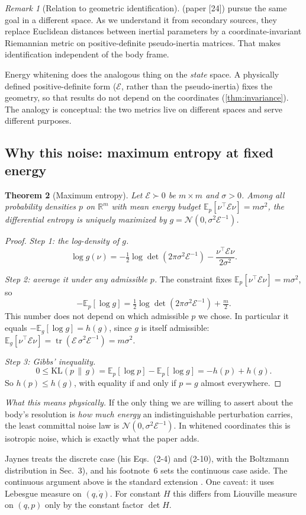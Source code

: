 \documentclass[11pt]{article}
\newtheorem{theorem}{Theorem}
\theoremstyle{definition}
\theoremstyle{remark}
\newtheorem{remark}[theorem]{Remark}
\newcommand{\R}{\mathbb{R}}
\newcommand{\E}{\mathbb{E}}
\newcommand{\tr}{\operatorname{tr}}
\newcommand{\Em}{\mathcal{E}}         %
\newcommand{\phys}[1]{\par\smallskip\noindent\textit{What this means physically.} #1\par}
\begin{document}
\begin{remark}[Relation to geometric identification]
\citet{lee2020geometric} (paper [24]) pursue the same goal in a different space. As we
understand it from secondary sources, they replace Euclidean distances between inertial
parameters by a coordinate-invariant Riemannian metric on positive-definite pseudo-inertia
matrices. That makes identification independent of the body frame.

Energy whitening does the analogous thing on the \emph{state} space. A physically defined
positive-definite form ($\Em$, rather than the pseudo-inertia) fixes the geometry, so that
results do not depend on the coordinates (\cref{thm:invariance}). The analogy is
conceptual: the two metrics live on different spaces and serve different purposes.
\end{remark}

\subsection{Why this noise: maximum entropy at fixed energy}

\begin{theorem}[Maximum entropy]\label{thm:maxent}
Let $\Em\succ0$ be $m\times m$ and $\sigma>0$. Among all probability densities $p$ on
$\R^m$ with mean energy budget $\E_p[\nu^\top\Em\nu]=m\sigma^2$, the differential
entropy is uniquely maximized by $g=\mathcal N(0,\sigma^2\Em^{-1})$.
\end{theorem}
\begin{proof}
\emph{Step 1: the log-density of $g$.}
\[
  \log g(\nu)=-\tfrac12\log\det(2\pi\sigma^2\Em^{-1})-\frac{\nu^\top\Em\nu}{2\sigma^2}.
\]

\emph{Step 2: average it under any admissible $p$.} The constraint fixes
$\E_p[\nu^\top\Em\nu]=m\sigma^2$, so
\[
  -\E_p[\log g]=\tfrac12\log\det(2\pi\sigma^2\Em^{-1})+\tfrac m2 .
\]
This number does not depend on which admissible $p$ we chose. In particular it equals
$-\E_g[\log g]=h(g)$, since $g$ is itself admissible:
$\E_g[\nu^\top\Em\nu]=\tr(\Em\,\sigma^2\Em^{-1})=m\sigma^2$.

\emph{Step 3: Gibbs' inequality.}
\[
  0\le \mathrm{KL}(p\,\|\,g)=\E_p[\log p]-\E_p[\log g]=-h(p)+h(g).
\]
So $h(p)\le h(g)$, with equality if and only if $p=g$ almost everywhere.
\end{proof}

\phys{If the only thing we are willing to assert about the body's resolution is
\emph{how much energy} an indistinguishable perturbation carries, the least committal
noise law \citep[Sec.~2]{jaynes1957information} is $\mathcal N(0,\sigma^2\Em^{-1})$.
In whitened coordinates this is isotropic noise, which is exactly what the paper adds.

Jaynes treats the discrete case (his Eqs.~(2-4) and (2-10), with the Boltzmann
distribution in Sec.~3), and his footnote~6 sets the continuous case aside. The
continuous argument above is the standard extension \citep[Ch.~12]{cover2006elements}. One caveat: it uses Lebesgue measure on $(q,\dot q)$. For constant $H$ this
differs from Liouville measure on $(q,p)$ only by the constant factor $\det H$.}
\end{document}
